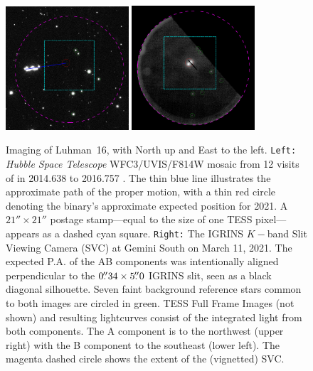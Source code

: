 \documentclass[modern]{aastex631}
\begin{document}
\begin{figure}[ht]
  \centering
    \includegraphics[width=1.8in]{figures/DS9_HST_zoom_in_matched.png}
    \includegraphics[width=1.8in]{figures/DS9_IGRINS_SVC_zoom_in.png} \\
\caption{Imaging of Luhman~16, with North up and East to the left.  \texttt{Left:} \emph{Hubble Space Telescope} WFC3/UVIS/F814W mosaic from 12 visits of in 2014.638 to 2016.757 \citep{2017MNRAS.470.1140B}.  The thin blue line illustrates the approximate path of the proper motion, with a thin red circle denoting the binary's approximate expected position for 2021. A $21'' \times 21''$ postage stamp---equal to the size of one TESS pixel---appears as a dashed cyan square.  \texttt{Right:} The IGRINS $K-$band Slit Viewing Camera (SVC) at Gemini South on March 11, 2021.  The expected P.A. of the AB components was intentionally aligned perpendicular to the $0\mbox{$.\!\!^{\prime\prime}$}34 \times 5\mbox{$.\!\!^{\prime\prime}$}0$ IGRINS slit, seen as a black diagonal silhouette. Seven faint background reference stars common to both images are circled in green.  TESS Full Frame Images (not shown) and resulting lightcurves consist of the integrated light from both components.  The A component is to the northwest (upper right) with the B component to the southeast (lower left).  The magenta dashed circle shows the extent of the (vignetted) SVC.}
\label{fig:imaging}
\end{figure}


\end{document}
